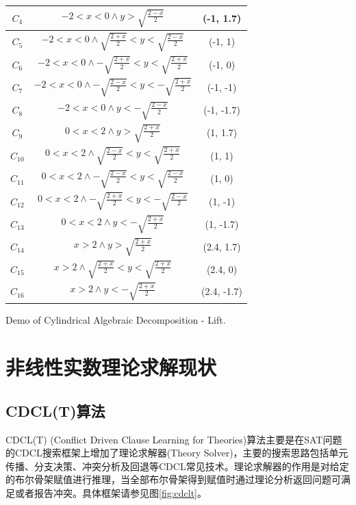 \begin{example}
\begin{enumerate}
\begin{table}[]
{\begin{tabular}{c | c | c}
            $C_4$ & $-2 < x < 0 \wedge y > \sqrt{\frac{2 - x}{2}}$ & (-1, 1.7) \\\hline
            $C_5$ & $-2 < x < 0 \wedge \sqrt{\frac{2 + x}{2}} < y < \sqrt{\frac{2 - x}{2}}$ & (-1, 1)\\\hline
            $C_6$ & $-2 < x < 0 \wedge -\sqrt{\frac{2 + x}{2}} < y < \sqrt{\frac{2 + x}{2}}$ & (-1, 0) \\\hline
            $C_7$ & $-2 < x < 0 \wedge -\sqrt{\frac{2 - x}{2}}< y < -\sqrt{\frac{2 + x}{2}}$ & (-1, -1) \\\hline
            $C_8$ & $-2 < x < 0 \wedge y < -\sqrt{\frac{2 - x}{2}}$ & (-1, -1.7) \\\hline

            $C_9$ & $0 < x < 2 \wedge y > \sqrt{\frac{2 + x}{2}}$ & (1, 1.7) \\\hline
            $C_10$ & $0 < x < 2 \wedge \sqrt{\frac{2 - x}{2}} < y < \sqrt{\frac{2 + x}{2}}$ & (1, 1) \\\hline
            $C_11$ & $0 < x < 2 \wedge -\sqrt{\frac{2 - x}{2}} < y < \sqrt{\frac{2 - x}{2}}$ & (1, 0) \\\hline
            $C_12$ & $0 < x < 2 \wedge -\sqrt{\frac{2 + x}{2}} < y < -\sqrt{\frac{2 - x}{2}}$ & (1, -1) \\\hline
            $C_13$ & $0 < x < 2 \wedge y < -\sqrt{\frac{2 + x}{2}}$ & (1, -1.7) \\\hline

            $C_14$ & $x > 2 \wedge y > \sqrt{\frac{2 + x}{2}}$ & (2.4, 1.7) \\\hline
            $C_15$ & $x > 2 \wedge \sqrt{\frac{2 + x}{2}} < y < \sqrt{\frac{2 + x}{2}}$ & (2.4, 0) \\\hline
            $C_16$ & $x > 2 \wedge y < -\sqrt{\frac{2 + x}{2}}$ & (2.4, -1.7) \\\hline
            \end{tabular}
        }
         {Demo of Cylindrical Algebraic Decomposition - Lift.}
        \label{tab:cad}
    \end{table}
\end{enumerate}
\label{ex:cad}    
\end{example}


\section{非线性实数理论求解现状}
\subsection{CDCL(T)算法}
CDCL(T) (Conflict Driven Clause Learning for Theories)算法主要是在SAT问题的CDCL搜索框架上增加了理论求解器(Theory Solver)，主要的搜索思路包括单元传播、分支决策、冲突分析及回退等CDCL常见技术。理论求解器的作用是对给定的布尔骨架赋值进行推理，当全部布尔骨架得到赋值时通过理论分析返回问题可满足或者报告冲突。具体框架请参见图\ref{fig:cdclt}。

